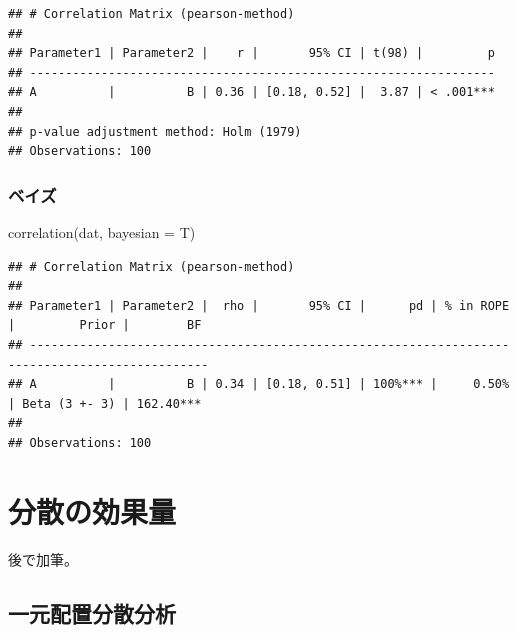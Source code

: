\documentclass[
  ja=standard, xelatex, base=12pt]{bxjsreport}
\newenvironment{Shaded}{\begin{snugshade}}{\end{snugshade}}
\newcommand{\AttributeTok}[1]{\textcolor[rgb]{0.77,0.63,0.00}{#1}}
\newcommand{\FunctionTok}[1]{\textcolor[rgb]{0.00,0.00,0.00}{#1}}
\newcommand{\NormalTok}[1]{#1}
\begin{document}
\begin{verbatim}
## # Correlation Matrix (pearson-method)
## 
## Parameter1 | Parameter2 |    r |       95% CI | t(98) |         p
## -----------------------------------------------------------------
## A          |          B | 0.36 | [0.18, 0.52] |  3.87 | < .001***
## 
## p-value adjustment method: Holm (1979)
## Observations: 100
\end{verbatim}

\hypertarget{ux30d9ux30a4ux30ba}{%
\subsection{ベイズ}\label{ux30d9ux30a4ux30ba}}

\begin{Shaded}
\begin{Highlighting}[]
\FunctionTok{correlation}\NormalTok{(dat, }\AttributeTok{bayesian =}\NormalTok{ T)}
\end{Highlighting}
\end{Shaded}

\begin{verbatim}
## # Correlation Matrix (pearson-method)
## 
## Parameter1 | Parameter2 |  rho |       95% CI |      pd | % in ROPE |         Prior |        BF
## -----------------------------------------------------------------------------------------------
## A          |          B | 0.34 | [0.18, 0.51] | 100%*** |     0.50% | Beta (3 +- 3) | 162.40***
## 
## Observations: 100
\end{verbatim}

\hypertarget{ux5206ux6563ux306eux52b9ux679cux91cf}{%
\chapter{分散の効果量}\label{ux5206ux6563ux306eux52b9ux679cux91cf}}

後で加筆。

\hypertarget{ux4e00ux5143ux914dux7f6eux5206ux6563ux5206ux6790}{%
\section{一元配置分散分析}\label{ux4e00ux5143ux914dux7f6eux5206ux6563ux5206ux6790}}
\end{document}

